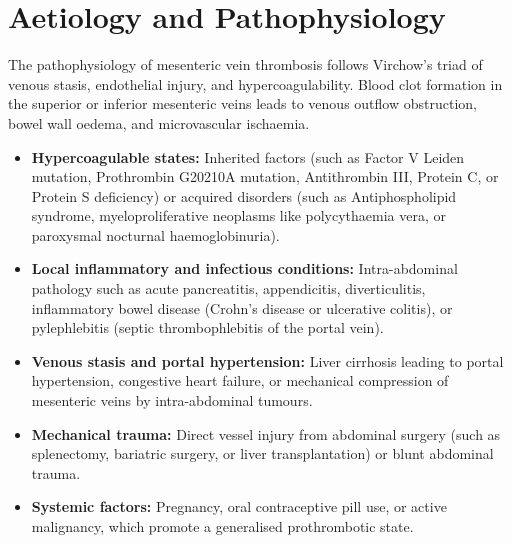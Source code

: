\section*{Aetiology and Pathophysiology}
The pathophysiology of mesenteric vein thrombosis follows Virchow's triad of venous stasis, endothelial injury, and hypercoagulability. Blood clot formation in the superior or inferior mesenteric veins leads to venous outflow obstruction, bowel wall oedema, and microvascular ischaemia.
\begin{itemize}
    \item \textbf{Hypercoagulable states:} Inherited factors (such as Factor V Leiden mutation, Prothrombin G20210A mutation, Antithrombin III, Protein C, or Protein S deficiency) or acquired disorders (such as Antiphospholipid syndrome, myeloproliferative neoplasms like polycythaemia vera, or paroxysmal nocturnal haemoglobinuria).
    \item \textbf{Local inflammatory and infectious conditions:} Intra-abdominal pathology such as acute pancreatitis, appendicitis, diverticulitis, inflammatory bowel disease (Crohn's disease or ulcerative colitis), or pylephlebitis (septic thrombophlebitis of the portal vein).
    \item \textbf{Venous stasis and portal hypertension:} Liver cirrhosis leading to portal hypertension, congestive heart failure, or mechanical compression of mesenteric veins by intra-abdominal tumours.
    \item \textbf{Mechanical trauma:} Direct vessel injury from abdominal surgery (such as splenectomy, bariatric surgery, or liver transplantation) or blunt abdominal trauma.
    \item \textbf{Systemic factors:} Pregnancy, oral contraceptive pill use, or active malignancy, which promote a generalised prothrombotic state.
\end{itemize}


